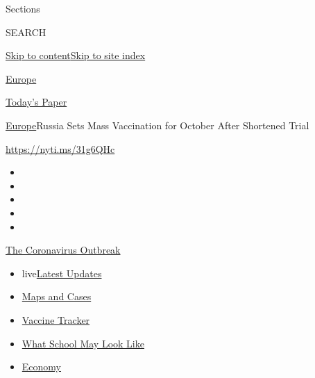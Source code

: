 Sections

SEARCH

\protect\hyperlink{site-content}{Skip to
content}\protect\hyperlink{site-index}{Skip to site index}

\href{https://www.nytimes3xbfgragh.onion/section/world/europe}{Europe}

\href{https://myaccount.nytimes3xbfgragh.onion/auth/login?response_type=cookie\&client_id=vi}{}

\href{https://www.nytimes3xbfgragh.onion/section/todayspaper}{Today's
Paper}

\href{/section/world/europe}{Europe}\textbar{}Russia Sets Mass
Vaccination for October After Shortened Trial

\url{https://nyti.ms/31g6QHc}

\begin{itemize}
\item
\item
\item
\item
\item
\end{itemize}

\href{https://www.nytimes3xbfgragh.onion/news-event/coronavirus?action=click\&pgtype=Article\&state=default\&region=TOP_BANNER\&context=storylines_menu}{The
Coronavirus Outbreak}

\begin{itemize}
\tightlist
\item
  live\href{https://www.nytimes3xbfgragh.onion/2020/08/02/world/coronavirus-updates.html?action=click\&pgtype=Article\&state=default\&region=TOP_BANNER\&context=storylines_menu}{Latest
  Updates}
\item
  \href{https://www.nytimes3xbfgragh.onion/interactive/2020/us/coronavirus-us-cases.html?action=click\&pgtype=Article\&state=default\&region=TOP_BANNER\&context=storylines_menu}{Maps
  and Cases}
\item
  \href{https://www.nytimes3xbfgragh.onion/interactive/2020/science/coronavirus-vaccine-tracker.html?action=click\&pgtype=Article\&state=default\&region=TOP_BANNER\&context=storylines_menu}{Vaccine
  Tracker}
\item
  \href{https://www.nytimes3xbfgragh.onion/interactive/2020/07/29/us/schools-reopening-coronavirus.html?action=click\&pgtype=Article\&state=default\&region=TOP_BANNER\&context=storylines_menu}{What
  School May Look Like}
\item
  \href{https://www.nytimes3xbfgragh.onion/live/2020/07/31/business/stock-market-today-coronavirus?action=click\&pgtype=Article\&state=default\&region=TOP_BANNER\&context=storylines_menu}{Economy}
\end{itemize}

